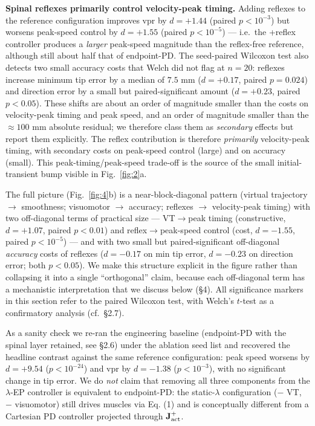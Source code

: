 \documentclass[sn-basic]{sn-jnl}
\begin{document}
\textbf{Spinal reflexes primarily control velocity-peak timing.} Adding
reflexes to the reference configuration improves vpr by \(d = +1.44\)
(paired \(p < 10^{-3}\)) but worsens peak-speed control by \(d = +1.55\)
(paired \(p < 10^{-5}\)) --- i.e.~the +reflex controller produces a
\emph{larger} peak-speed magnitude than the reflex-free reference,
although still about half that of endpoint-PD. The seed-paired Wilcoxon
test also detects two small accuracy costs that Welch did not flag at
\(n = 20\): reflexes increase minimum tip error by a median of \(7.5\)
mm (\(d = +0.17\), paired \(p = 0.024\)) and direction error by a small
but paired-significant amount (\(d = +0.23\), paired \(p < 0.05\)).
These shifts are about an order of magnitude smaller than the costs on
velocity-peak timing and peak speed, and an order of magnitude smaller
than the \(\approx 100\) mm absolute residual; we therefore class them
as \emph{secondary} effects but report them explicitly. The reflex
contribution is therefore \emph{primarily} velocity-peak timing, with
secondary costs on peak-speed control (large) and on accuracy (small).
This peak-timing/peak-speed trade-off is the source of the small
initial-transient bump visible in Fig.~\ref{fig:2}a.

The full picture (Fig.~\ref{fig:4}b) is a near-block-diagonal pattern (virtual
trajectory \(\to\) smoothness; visuomotor \(\to\) accuracy; reflexes
\(\to\) velocity-peak timing) with two off-diagonal terms of practical
size --- VT\(\to\)peak timing (constructive, \(d = +1.07\), paired
\(p < 0.01\)) and reflex\(\to\)peak-speed control (cost, \(d = -1.55\),
paired \(p < 10^{-5}\)) --- and with two small but paired-significant
off-diagonal \emph{accuracy} costs of reflexes (\(d = -0.17\) on min tip
error, \(d = -0.23\) on direction error; both \(p < 0.05\)). We make
this structure explicit in the figure rather than collapsing it into a
single ``orthogonal'' claim, because each off-diagonal term has a
mechanistic interpretation that we discuss below (§4). All significance
markers in this section refer to the paired Wilcoxon test, with Welch's
\(t\)-test as a confirmatory analysis (cf.~§2.7).

As a sanity check we re-ran the engineering baseline (endpoint-PD with
the spinal layer retained, see §2.6) under the ablation seed list and
recovered the headline contrast against the same reference
configuration: peak speed worsens by \(d = +9.54\) (\(p < 10^{-24}\))
and vpr by \(d = -1.38\) (\(p < 10^{-3}\)), with no significant change
in tip error. We do \emph{not} claim that removing all three components
from the $\lambda$-EP controller is equivalent to endpoint-PD: the static-$\lambda$
configuration ($-$ VT, $-$ visuomotor) still drives muscles via Eq. (1) and
is conceptually different from a Cartesian PD controller projected
through \(\mathbf{J}_{\rm act}^{+}\).
\end{document}
